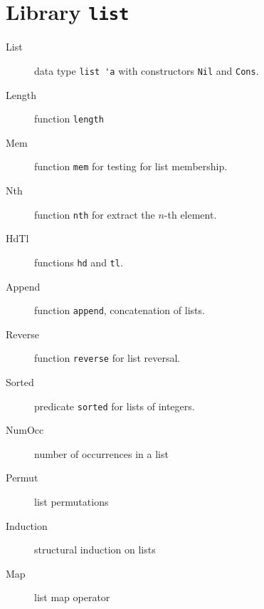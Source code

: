\section{Library \texttt{list}}

\begin{description}
\item[List] data type \verb|list 'a| with constructors \verb|Nil| and
  \verb|Cons|.
\item[Length] function \verb|length|
\item[Mem] function \verb|mem| for testing for list membership.
\item[Nth] function \verb|nth| for extract the $n$-th element.
\item[HdTl] functions \verb|hd| and \verb|tl|.
\item[Append] function \verb|append|, concatenation of lists.
\item[Reverse] function \verb|reverse| for list reversal.
\item[Sorted] predicate \verb|sorted| for lists of integers.
\item[NumOcc] number of occurrences in a list
\item[Permut] list permutations
\item[Induction] structural induction on lists
\item[Map] list map operator
\end{description}





